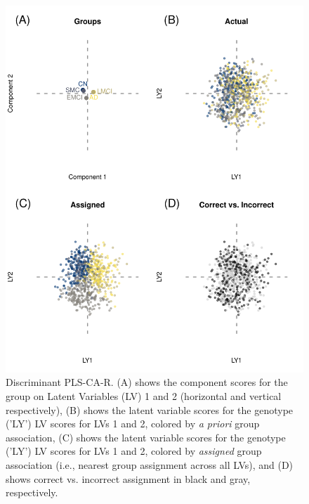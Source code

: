 \documentclass[12pt]{article}
\begin{document}
\begin{figure}[!hbtp]

{\centering \includegraphics[width=.8\textwidth,height=.8\textheight]{PLSCAR_to_a_GPLS_blind_files/figure-latex/unnamed-chunk-5-1} 

}

\caption{\label{fig:discriminant_ex1} Discriminant PLS-CA-R. (A) shows the component scores for the group on Latent Variables (LV) 1 and 2 (horizontal and vertical respectively), (B) shows the latent variable scores for the genotype ('LY') LV scores for LVs 1 and 2, colored by \textit{a priori} group association, (C) shows the latent variable scores for the genotype ('LY') LV scores for LVs 1 and 2, colored by \textit{assigned} group association (i.e., nearest group assignment across all LVs), and (D) shows correct vs. incorrect assignment in black and gray, respectively.}\label{fig:unnamed-chunk-5}
\end{figure}
\end{document}
